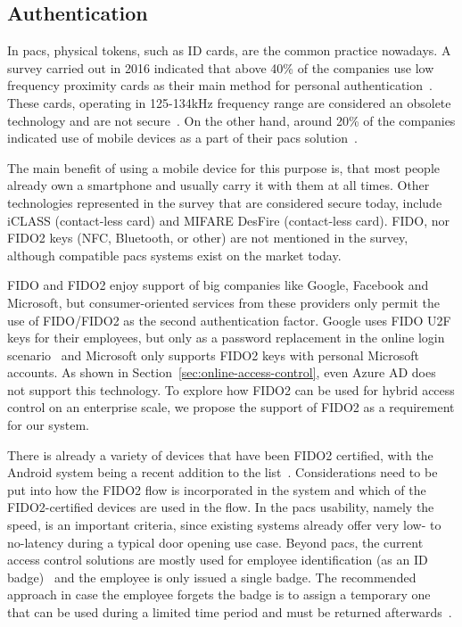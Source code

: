 \subsection{Authentication}
In \acrshort{pacs}, physical tokens, such as ID cards, are the common practice nowadays. A survey carried out in 2016 indicated that above 40\% of the companies use low frequency proximity cards as their main method for personal authentication~\cite{HIDGlobal2017TheEnterprise}. These cards, operating in 125-134kHz frequency range are considered an obsolete technology and are not secure~\cite{Hakamaki2015SecurityTechnology}. On the other hand, around 20\% of the companies indicated use of mobile devices as a part of their \acrshort{pacs} solution~\cite{HIDGlobal2017TheEnterprise}. 

The main benefit of using a mobile device for this purpose is, that most people already own a smartphone and usually carry it with them at all times. Other technologies represented in the survey that are considered secure today, include iCLASS (contact-less card) and MIFARE DesFire (contact-less card). FIDO, nor FIDO2 keys (NFC, Bluetooth, or other) are not mentioned in the survey, although compatible \acrshort{pacs} systems exist on the market today\footnotemark. 

FIDO and FIDO2 enjoy support of big companies like Google, Facebook and Microsoft, but consumer-oriented services from these providers only permit the use of FIDO/FIDO2 as the second authentication factor. Google uses FIDO U2F keys for their employees, but only as a password replacement in the online login scenario~\cite{Krebs2018Google:Phishing} and Microsoft only supports FIDO2 keys with personal Microsoft accounts. As shown in Section~\ref{sec:online-access-control}, even Azure AD does not support this technology. To explore how FIDO2 can be used for hybrid access control on an enterprise scale, we propose the support of FIDO2 as a requirement for our system.
% 

There is already a variety of devices that have been FIDO2 certified, with the Android system being a recent addition to the list~\cite{FIDOAlliance2019AndroidPasswords}. Considerations need to be put into how the FIDO2 flow is incorporated in the system and which of the FIDO2-certified devices are used in the flow. In the \acrshort{pacs} usability, namely the speed, is an important criteria, since existing systems already offer very low- to no-latency during a typical door opening use case. Beyond \acrshort{pacs}, the current access control solutions are mostly used for employee identification (as an ID badge)~\cite{HIDGlobal2017TheEnterprise} and the employee is only issued a single badge. The recommended approach in case the employee forgets the badge is to assign a temporary one that can be used during a limited time period and must be returned afterwards~\cite{Ryan2018HowBadges}.

